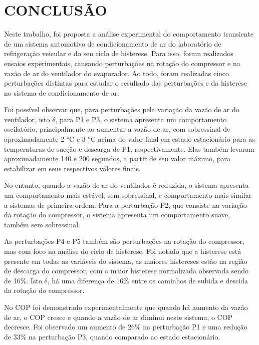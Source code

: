 \section{CONCLUSÃO}

Neste trabalho, foi proposta a análise experimental do comportamento transiente de um sistema automotivo de condicionamento de ar do laboratório de refrigeração veicular \textcite{reve2023} e do seu ciclo de histerese. Para isso, foram realizados ensaios experimentais, causando perturbações na rotação do compressor e na vazão de ar do ventilador do evaporador. Ao todo, foram realizadas cinco perturbações distintas para estudar o resultado das perturbações e da histerese no sistema de condicionamento de ar. 

Foi possível observar que, para perturbações pela variação da vazão de ar do ventilador, isto é, para P1 e P3, o sistema apresenta um comportamento oscilatório, principalmente ao aumentar a vazão de ar, com sobressinal de aproximadamente 2 °C e 3 °C acima do valor final em estado estacionário para as temperaturas de sucção e descarga de P1, respectivamente. Elas também levaram aproximadamente 140 e 200 segundos, a partir de seu valor máximo, para estabilizar em seus respectivos valores finais. 

No entanto, quando a vazão de ar do ventilador é reduzida, o sistema apresenta um comportamento mais estável, sem sobressinal, e comportamento mais similar a sistemas de primeira ordem. Para a perturbação P2, que consiste na variação da rotação do compressor, o sistema apresenta um comportamento suave, também sem sobressinal. 

As perturbações P4 e P5 também são perturbações na rotação do compressor, mas com foco na análise do ciclo de histerese. Foi notado que a histerese está presente em todas as variáveis do sistema, as maiores histereses estão na região de descarga do compressor, com a maior histerese normalizada observada sendo de 16\%. Isto é, há uma diferença de 16\% entre os caminhos de subida e descida da rotação do compressor. 

No COP foi demonstrado experimentalmente que quando há aumento da vazão de ar, o COP cresce e quando a vazão de ar diminui neste sistema, o COP decresce. Foi observado um aumento de 26\% na perturbação P1 e uma redução de 33\% na perturbação P3, quando comparado ao estado estacionário. 

